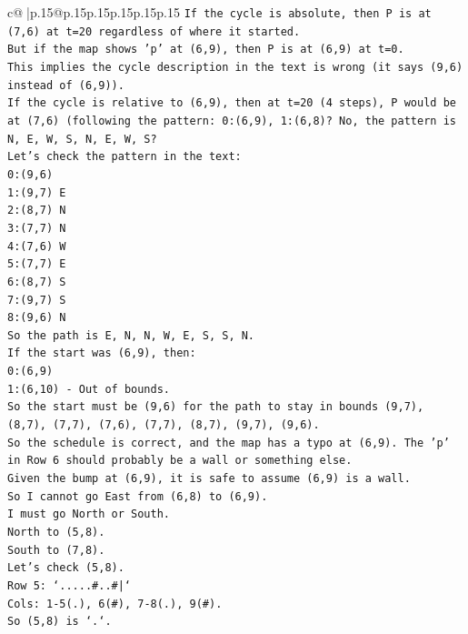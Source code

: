 \documentclass{article}
\begin{document}
{\begin{supertabular}{c@{$\;$}|p{.15\linewidth}@{}p{.15\linewidth}p{.15\linewidth}p{.15\linewidth}p{.15\linewidth}p{.15\linewidth}}
{{{\texttt{If the cycle is absolute, then P is at (7,6) at t=20 regardless of where it started.} \\
\texttt{But if the map shows 'p' at (6,9), then P is at (6,9) at t=0.} \\
\texttt{This implies the cycle description in the text is wrong (it says (9,6) instead of (6,9)).} \\
\texttt{If the cycle is relative to (6,9), then at t=20 (4 steps), P would be at (7,6) (following the pattern: 0:(6,9), 1:(6,8)? No, the pattern is N, E, W, S, N, E, W, S?} \\
\texttt{Let's check the pattern in the text:} \\
\texttt{0:(9,6)} \\
\texttt{1:(9,7) E} \\
\texttt{2:(8,7) N} \\
\texttt{3:(7,7) N} \\
\texttt{4:(7,6) W} \\
\texttt{5:(7,7) E} \\
\texttt{6:(8,7) S} \\
\texttt{7:(9,7) S} \\
\texttt{8:(9,6) N} \\
\texttt{So the path is E, N, N, W, E, S, S, N.} \\
\texttt{If the start was (6,9), then:} \\
\texttt{0:(6,9)} \\
\texttt{1:(6,10) {-} Out of bounds.} \\
\texttt{So the start must be (9,6) for the path to stay in bounds (9,7), (8,7), (7,7), (7,6), (7,7), (8,7), (9,7), (9,6).} \\
\texttt{So the schedule is correct, and the map has a typo at (6,9). The 'p' in Row 6 should probably be a wall or something else.} \\
\texttt{Given the bump at (6,9), it is safe to assume (6,9) is a wall.} \\
\texttt{So I cannot go East from (6,8) to (6,9).} \\
\texttt{I must go North or South.} \\
\texttt{North to (5,8).} \\
\texttt{South to (7,8).} \\
\texttt{Let's check (5,8).} \\
\texttt{Row 5: `.....\#..\#|`} \\
\texttt{Cols: 1{-}5(.), 6(\#), 7{-}8(.), 9(\#).} \\
\texttt{So (5,8) is `.`.} \\
}}}
\end{supertabular}}
\end{document}
